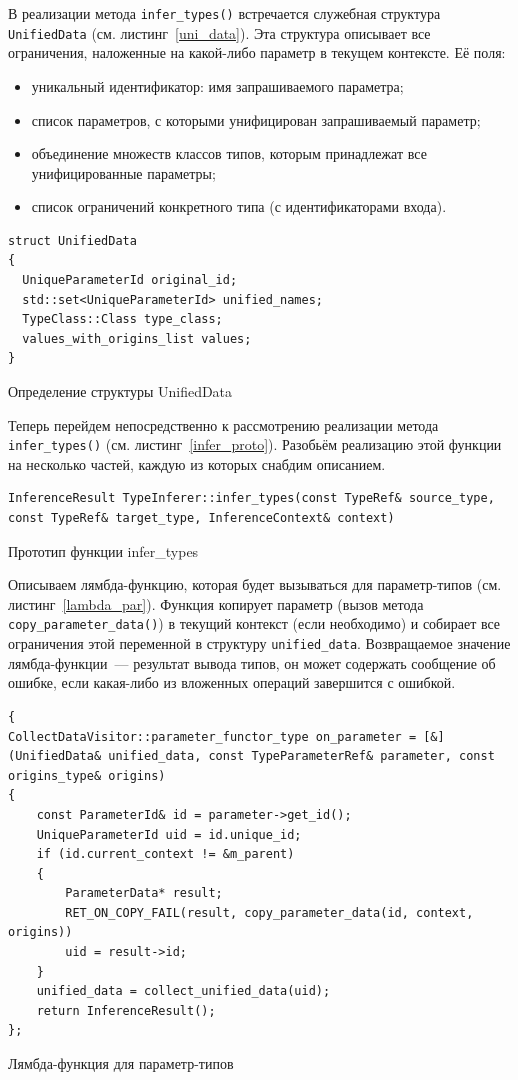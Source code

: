 В реализации метода \lstinline!infer_types()! встречается служебная структура \lstinline!UnifiedData! (см. листинг~\ref{uni_data}). Эта структура описывает все ограничения, наложенные на какой-либо параметр в текущем контексте. Её поля:
\begin{itemize}
	\item уникальный идентификатор: имя запрашиваемого параметра;
	\item список параметров, с которыми унифицирован запрашиваемый параметр;
	\item объединение множеств классов типов, которым принадлежат все унифицированные параметры;
	\item список ограничений конкретного типа (с идентификаторами входа).
\end{itemize}

\begin{ListingEnv}[H]
	\begin{lstlisting}
struct UnifiedData
{
  UniqueParameterId original_id;
  std::set<UniqueParameterId> unified_names;
  TypeClass::Class type_class;
  values_with_origins_list values;
}
	\end{lstlisting}
	\caption{Определение структуры UnifiedData}\label{uni_data}
\end{ListingEnv}


Теперь перейдем непосредственно к рассмотрению реализации метода \lstinline!infer_types()! (см. листинг~\ref{infer_proto}). Разобьём реализацию этой функции на несколько частей, каждую из которых снабдим описанием.
\begin{ListingEnv}[H]
	\begin{lstlisting}
InferenceResult TypeInferer::infer_types(const TypeRef& source_type, const TypeRef& target_type, InferenceContext& context)
	\end{lstlisting}
	\caption{Прототип функции infer\_types}\label{infer_proto}
\end{ListingEnv}
	Описываем лямбда-функцию, которая будет вызываться для параметр-типов (см. листинг~\ref{lambda_par}).
	Функция копирует параметр (вызов метода \lstinline!copy_parameter_data()!) в текущий контекст (если необходимо) и собирает все ограничения этой переменной в структуру \lstinline!unified_data!.
	Возвращаемое значение лямбда-функции~--- результат вывода типов, он может содержать сообщение об ошибке, если какая-либо из вложенных операций завершится с ошибкой.
\begin{ListingEnv}[h]
	\begin{lstlisting}
{	
CollectDataVisitor::parameter_functor_type on_parameter = [&](UnifiedData& unified_data, const TypeParameterRef& parameter, const origins_type& origins)
{
	const ParameterId& id = parameter->get_id();
	UniqueParameterId uid = id.unique_id;
	if (id.current_context != &m_parent)
	{
		ParameterData* result;
		RET_ON_COPY_FAIL(result, copy_parameter_data(id, context, origins))
		uid = result->id;
	}
	unified_data = collect_unified_data(uid);
	return InferenceResult();
};
	\end{lstlisting}
	\caption{Лямбда-функция для параметр-типов}\label{lambda_par}
\end{ListingEnv}

